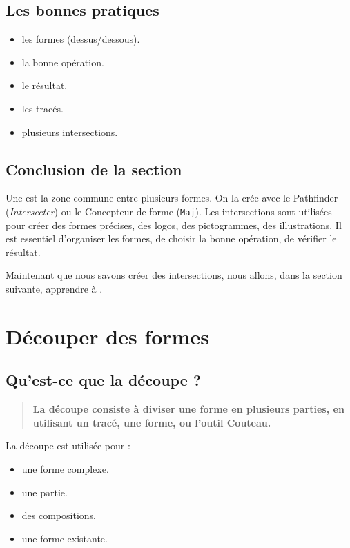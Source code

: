 \subsection{Les bonnes pratiques}

\begin{itemize}
    \item {} les formes (dessus/dessous).
    \item {} la bonne opération.
    \item {} le résultat.
    \item {} les tracés.
    \item {} plusieurs intersections.
\end{itemize}

\subsection*{Conclusion de la section}

Une  est la zone commune entre plusieurs formes. On la crée avec le Pathfinder (\emph{Intersecter}) ou le Concepteur de forme (\texttt{Maj}). Les intersections sont utilisées pour créer des formes précises, des logos, des pictogrammes, des illustrations. Il est essentiel d'organiser les formes, de choisir la bonne opération, de vérifier le résultat.

Maintenant que nous savons créer des intersections, nous allons, dans la section suivante, apprendre à .

\section{Découper des formes}

\subsection{Qu'est-ce que la découpe ?}

\begin{quote}
\textbf{La découpe consiste à diviser une forme en plusieurs parties, en utilisant un tracé, une forme, ou l'outil Couteau.}
\end{quote}

La découpe est utilisée pour :

\begin{itemize}
    \item {} une forme complexe.
    \item {} une partie.
    \item {} des compositions.
    \item {} une forme existante.
\end{itemize}

